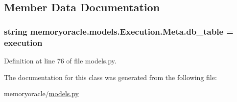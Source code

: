 \subsection{Member Data Documentation}
\hypertarget{classmemoryoracle_1_1models_1_1Execution_1_1Meta_a126a8741d36c9f383107c8fde73c642c}{}
\subsubsection[{db\+\_\+table}]{\setlength{\rightskip}{0pt plus 5cm}string memoryoracle.\+models.\+Execution.\+Meta.\+db\+\_\+table = \textquotesingle{}execution\textquotesingle{}\hspace{0.3cm}{\ttfamily [static]}}\label{classmemoryoracle_1_1models_1_1Execution_1_1Meta_a126a8741d36c9f383107c8fde73c642c}


Definition at line 76 of file models.\+py.



The documentation for this class was generated from the following file\+:\begin{DoxyCompactItemize}
\item 
memoryoracle/\hyperlink{models_8py}{models.\+py}\end{DoxyCompactItemize}
